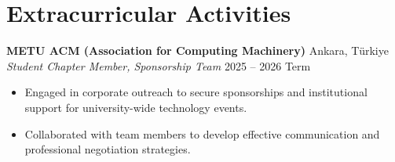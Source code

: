 \documentclass[11pt,a4paper]{article}
\begin{document}
\section*{Extracurricular Activities}
\textbf{METU ACM (Association for Computing Machinery)} \hfill Ankara, Türkiye \\
\textit{Student Chapter Member, Sponsorship Team} \hfill 2025 -- 2026 Term
\begin{itemize}
    \item Engaged in corporate outreach to secure sponsorships and institutional support for university-wide technology events.
    \item Collaborated with team members to develop effective communication and professional negotiation strategies.
\end{itemize}
\end{document}

